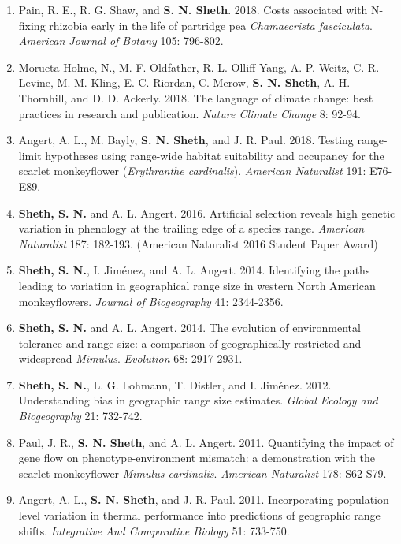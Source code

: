 \documentclass[11pt,english]{article}\usepackage[]{graphicx}\usepackage[]{color}
\begin{document}
\begin{hangparas}{.5in}{1}
\begin{enumerate}
\item Pain, R. E., R. G. Shaw, and \textbf{S. N. Sheth}. 2018. Costs associated with N-fixing rhizobia early in the life of partridge pea \textit{Chamaecrista fasciculata}. \emph{American Journal of Botany} 105: 796-802. 

\item Morueta-Holme, N., M. F. Oldfather, R. L. Olliff-Yang, A. P. Weitz, C. R. Levine, M. M. Kling, E. C. Riordan, C. Merow, \textbf{S. N. Sheth}, A. H. Thornhill, and D. D. Ackerly. 2018. The language of climate change: best practices in research and publication. \emph{Nature Climate Change} 8: 92-94.

\item Angert, A. L., M. Bayly, \textbf{S. N. Sheth}, and J. R. Paul. 2018. Testing range-limit hypotheses using range-wide habitat suitability and occupancy for the scarlet monkeyflower (\textit{Erythranthe cardinalis}). \emph{American Naturalist} 191: E76-E89.

 \item \textbf{Sheth, S. N.} and A. L. Angert. 2016. Artificial selection reveals high genetic variation in phenology at the trailing edge of a species range. \emph{American Naturalist} 187: 182-193. (American Naturalist 2016 Student Paper Award) 
 
\item \textbf{Sheth, S. N.}, I. Jim\'enez, and A. L. Angert. 2014. Identifying the paths leading to variation in geographical range size in western North American monkeyflowers. \emph{Journal of Biogeography} 41: 2344-2356. 

\item \textbf{Sheth, S. N.} and A. L. Angert. 2014. The evolution of environmental tolerance and range size: a comparison of geographically restricted and widespread \textit{Mimulus}. \emph{Evolution} 68: 2917-2931. 

\item \textbf{Sheth, S. N.}, L. G. Lohmann, T. Distler, and I. Jim\'enez. 2012. Understanding bias in geographic range size estimates. \emph{Global Ecology and Biogeography} 21: 732-742.
 
 \item Paul, J. R., \textbf{S. N. Sheth}, and A. L. Angert. 2011. Quantifying the impact of gene flow on phenotype-environment mismatch: a demonstration with the scarlet monkeyflower \textit{Mimulus cardinalis}. \emph{American Naturalist} 178: S62-S79. 
 
\item Angert, A. L., \textbf{S. N. Sheth}, and J. R. Paul. 2011. Incorporating population-level variation in thermal performance into predictions of geographic range shifts. \emph{Integrative And Comparative Biology} 51: 733-750. 


\end{enumerate}
\end{hangparas}
\end{document}
